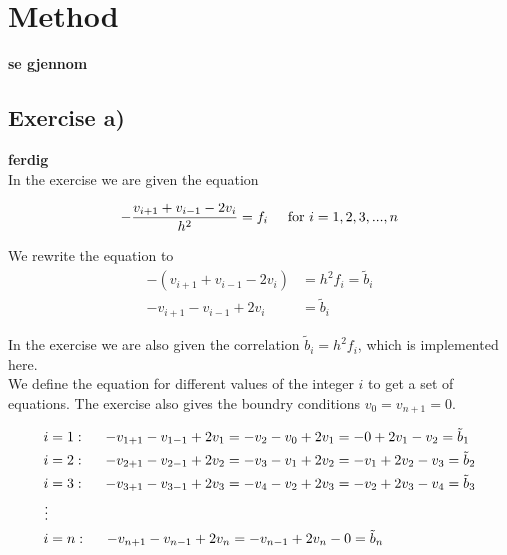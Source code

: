 \documentclass{article}
\begin{document}
\vspace{1cm}

\section{Method} \label{sec:Method}

  {\large \bf se gjennom} \\

\subsection{Exercise a)} \label{sec:Method a)}

  {\large \bf ferdig} \\

  In the exercise we are given the equation

  \begin{equation*}
    - \frac{v_{i+1} + v_{i-1} - 2 v_i}{h^2} = f_i \hspace{5mm} \textrm{for} ~  i = 1, 2, 3, ... , n
  \end{equation*}

  We rewrite the equation to
  \begin{align*}
    - (v_{i+1} + v_{i-1} - 2 v_i) &= h^2 f_i = \tilde{b}_i \\
    - v_{i+1} - v_{i-1} + 2 v_i &= \tilde{b}_i
  \end{align*}

  In the exercise we are also given the correlation $\tilde{b}_i = h^2 f_i$, which is implemented here. \\

  We define the equation for different values of the integer $i$ to get a set of equations. The exercise also gives the boundry conditions $v_0 = v_{n+1} = 0$.

  \begin{align*}
    i &= 1 : \hspace{5mm} - v_{1+1} - v_{1-1} + 2 v_1 = - v_2 - v_0 + 2 v_1 = - 0 + 2 v_1 - v_2 = \tilde{b}_1 \\
    i &= 2 : \hspace{5mm} - v_{2+1} - v_{2-1} + 2 v_2 = - v_3 - v_1 + 2 v_2 = - v_1 + 2 v_2 - v_3 = \tilde{b}_2 \\
    i &= 3 : \hspace{5mm} - v_{3+1} - v_{3-1} + 2 v_3 = - v_4 - v_2 + 2 v_3 = - v_2 + 2 v_3 - v_4 = \tilde{b}_3 \\
    \vdots \\
    i &= n : \hspace{5mm} - v_{n+1} - v_{n-1} + 2 v_n = - v_{n-1} + 2 v_n - 0 = \tilde{b}_n \\
  \end{align*}
\end{document}

